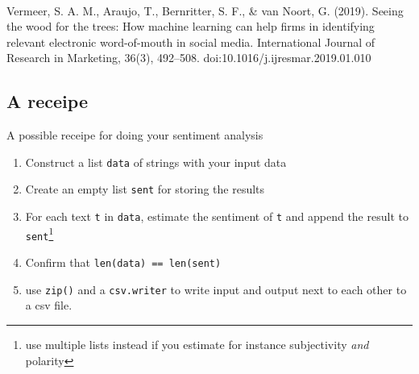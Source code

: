 \documentclass{beamer}
\begin{document}
\begin{frame}%
	\\
	\tiny
Vermeer, S. A. M., Araujo, T., Bernritter, S. F., \& van Noort, G. (2019). Seeing the wood for the trees: How machine learning can help firms in identifying relevant electronic word-of-mouth in social media. International Journal of Research in Marketing, 36(3), 492–508. doi:10.1016/j.ijresmar.2019.01.010
\end{frame}



\subsection{A receipe}

\begin{frame}{A possible receipe for doing your sentiment analysis}
	
\begin{enumerate}
	\item Construct a list \texttt{data} of strings with your input data
	\item Create an empty list \texttt{sent} for storing the results
	\item For each text \texttt{t} in \texttt{data}, estimate the sentiment of \texttt{t} and append the result to \texttt{sent}\footnote{use multiple lists instead if you estimate for instance subjectivity \emph{and} polarity}
	\item Confirm that \texttt{len(data) == len(sent)}
	\item use \texttt{zip()} and a  \texttt{csv.writer} to write input and output next to each other to a csv file.
\end{enumerate}

\end{frame}
\end{document}
